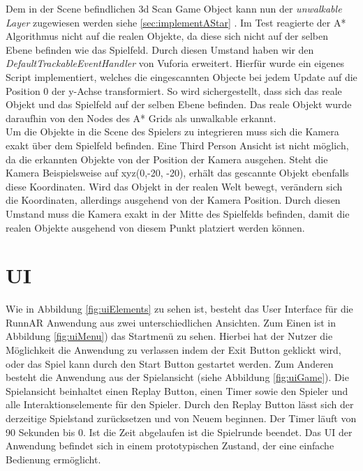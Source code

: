 Dem in der Scene befindlichen 3d Scan Game Object kann nun der \textit{unwalkable Layer} zugewiesen werden siehe \ref{sec:implementAStar} . Im Test reagierte der A* Algorithmus nicht auf die realen Objekte, da diese sich nicht auf der selben Ebene befinden wie das Spielfeld. Durch diesen Umstand haben wir den \textit{DefaultTrackableEventHandler} von Vuforia erweitert. Hierfür wurde ein eigenes Script implementiert, welches die eingescannten Objecte bei jedem Update auf die Position 0 der y-Achse transformiert. So wird sichergestellt, dass sich das reale Objekt und das Spielfeld auf der selben Ebene befinden. Das reale Objekt wurde daraufhin von den Nodes des A* Grids als unwalkable erkannt. \\
Um die Objekte in die Scene des Spielers zu integrieren muss sich die Kamera exakt über dem Spielfeld befinden. Eine Third Person Ansicht ist nicht möglich, da die erkannten Objekte von der Position der Kamera ausgehen. Steht die Kamera Beispielsweise auf xyz(0,-20, -20), erhält das gescannte Objekt ebenfalls diese Koordinaten. Wird das Objekt in der realen Welt bewegt, verändern sich die Koordinaten, allerdings ausgehend von der Kamera Position. Durch diesen Umstand muss die Kamera exakt in der Mitte des Spielfelds befinden, damit die realen Objekte ausgehend von diesem Punkt platziert werden können.

\section{UI}
Wie in Abbildung \ref{fig:uiElements} zu sehen ist, besteht das User Interface für die RunnAR Anwendung aus zwei unterschiedlichen Ansichten. Zum Einen ist in Abbildung \ref{fig:uiMenu}) das Startmenü zu sehen. Hierbei hat der Nutzer die Möglichkeit die Anwendung zu verlassen indem der Exit Button geklickt wird, oder das Spiel kann durch den Start Button gestartet werden. Zum Anderen besteht die Anwendung aus der Spielansicht (siehe Abbildung \ref{fig:uiGame}). Die Spielansicht beinhaltet einen Replay Button, einen Timer sowie den Spieler und alle Interaktionselemente für den Spieler. Durch den Replay Button lässt sich der derzeitige Spielstand zurücksetzen und von Neuem beginnen. Der Timer läuft von 90 Sekunden bis 0. Ist die Zeit abgelaufen ist die Spielrunde beendet. Das UI der Anwendung befindet sich in einem prototypischen Zustand, der eine einfache Bedienung ermöglicht.

